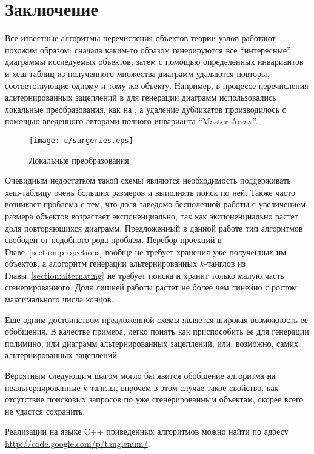 \newpage
\section{Заключение}
	Все известные алгоритмы перечисления объектов теории узлов работают похожим образом: сначала каким-то образом генерируются
	все ``интересные'' диаграммы исследуемых объектов, затем с помощью определенных инвариантов и хеш-таблиц из полученного
	множества диаграмм удаляются повторы, соответствующие одному и тому же объекту. Например, в процессе перечисления альтернированных
	зацеплений в \cite{Rankin2002_1, Rankin2002_2, Rankin2002_3} для генерации диаграмм использовались локальные преобразования,
	как на , а удаление дубликатов производилось с помощью введенного авторами полного инварианта
	``Master Array''.
	\begin{figure}[ht]
		\centering
		\texttt{[image: c/surgeries.eps]}
		\caption{Локальные преобразования\label{figure:surgeries}}
	\end{figure}

	Очевидным недостатком такой схемы являются необходимость поддерживать хеш-таблицу очень больших размеров и выполнять поиск
	по ней. Также часто возникает проблема с тем, что доля заведомо бесполезной работы с увеличением размера объектов возрастает
	экспоненциально, так как экспоненциально растет доля повторяющихся диаграмм. Предложенный в данной работе тип алгоритмов
	свободен от подобного рода проблем. Перебор проекций в Главе~\ref{section:projections} вообще не требует хранения уже
	полученных им объектов, а алогоритм генерации альтернированных $k$-танглов из Главы~\ref{section:alternating} не требует
	поиска и хранит только малую часть сгенерированного. Доля лишней работы растет не более чем линейно с ростом максимального
	числа концов.

	Еще одним достоинством предложенной схемы является широкая возможность ее обобщения. В качестве примера, легко понять как
	приспособить ее для генерации полимино, или диаграмм альтернированных зацеплений, или, возможно, самих альтернированных
	зацеплений.

	Вероятным следующим шагом могло бы явится обобщение алгоритма на неальтернированные $k$-танглы, впрочем в этом случае такое
	свойство, как отсутствие поисковых запросов по уже сгенерированным объектам, скорее всего не удастся сохранить.

	Реализации на языке C++ приведенных алгоритмов можно найти по адресу \uline{http://code.google.com/p/tanglenum/}.
